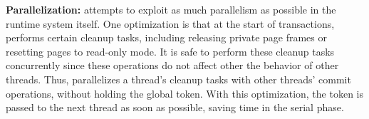 \textbf{Parallelization: }
\dthreads{} attempts to exploit as much parallelism as possible in the runtime system itself. One optimization is that at the start of transactions, \dthreads{} performs certain cleanup tasks, including releasing private page frames or resetting pages to read-only mode. It is safe to perform these cleanup tasks concurrently since these operations do not affect other the behavior of other threads.
Thus, \dthreads{} parallelizes a thread's cleanup tasks with other threads’ commit operations, without holding the global token. With this optimization, the token is passed to the next thread as soon as possible, saving time in the serial phase. 